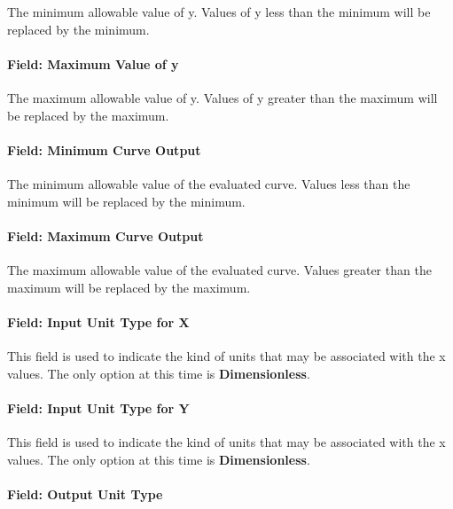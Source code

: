 The minimum allowable value of y. Values of y less than the minimum will be replaced by the minimum.

\paragraph{Field: Maximum Value of y}\label{field-maximum-value-of-y-3}

The maximum allowable value of y. Values of y greater than the maximum will be replaced by the maximum.

\paragraph{Field: Minimum Curve Output}\label{field-minimum-curve-output-7}

The minimum allowable value of the evaluated curve. Values less than the minimum will be replaced by the minimum.

\paragraph{Field: Maximum Curve Output}\label{field-maximum-curve-output-6}

The maximum allowable value of the evaluated curve. Values greater than the maximum will be replaced by the maximum.

\paragraph{Field: Input Unit Type for X}\label{field-input-unit-type-for-x-8}

This field is used to indicate the kind of units that may be associated with the x values. The only option at this time is \textbf{Dimensionless}.

\paragraph{Field: Input Unit Type for Y}\label{field-input-unit-type-for-y-3}

This field is used to indicate the kind of units that may be associated with the x values. The only option at this time is \textbf{Dimensionless}.

\paragraph{Field: Output Unit Type}\label{field-output-unit-type-7}

